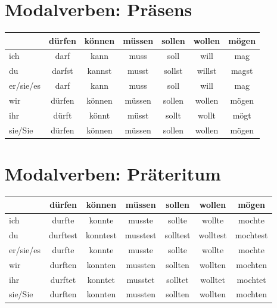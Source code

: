 \section{Modalverben: Präsens}
\label{sec:ModalverbenPraesens}

\begin{center}
\begin{tabular}{|l|c|c|c|c|c|c|}
\hline
\textbf{} & \textbf{dürfen} & \textbf{können} & \textbf{müssen} & \textbf{sollen} & \textbf{wollen} & \textbf{mögen} \\ \hline
ich & darf & kann & muss & soll & will & mag \\ \hline
du & darfst & kannst & musst & sollst & willst & magst \\ \hline
er/sie/es & darf & kann & muss & soll & will & mag \\ \hline
wir & dürfen & können & müssen & sollen & wollen & mögen \\ \hline
ihr & dürft & könnt & müsst & sollt & wollt & mögt \\ \hline
sie/Sie & dürfen & können & müssen & sollen & wollen & mögen \\ \hline
\end{tabular}
\end{center}

\section{Modalverben: Präteritum}
\label{sec:ModalverbenPraeteritum}

\begin{center}
\begin{tabular}{|l|c|c|c|c|c|c|}
\hline
\textbf{} & \textbf{dürfen} & \textbf{können} & \textbf{müssen} & \textbf{sollen} & \textbf{wollen} & \textbf{mögen} \\ \hline
ich & durfte & konnte & musste & sollte & wollte & mochte \\ \hline
du & durftest & konntest & musstest & solltest & wolltest & mochtest \\ \hline
er/sie/es & durfte & konnte & musste & sollte & wollte & mochte \\ \hline
wir & durften & konnten & mussten & sollten & wollten & mochten \\ \hline
ihr & durftet & konntet & musstet & solltet & wolltet & mochtet \\ \hline
sie/Sie & durften & konnten & mussten & sollten & wollten & mochten \\ \hline
\end{tabular}
\end{center}


